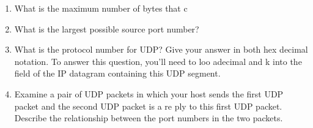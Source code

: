 \begin{enumerate}[label=\bfseries Problem \arabic*:,leftmargin=*,labelindent=1em]
        \item What is the maximum number of bytes that c\\[0.2mm]
        \soln
        \item What is the largest possible source port number?\\[0.2mm]
        \soln
        \item What is the protocol number for UDP? 
        Give your answer in both hex decimal notation. 
        To answer this question, you’ll need to loo adecimal and k into the field of the IP datagram containing this UDP segment.\\[0.2mm]
        \soln
        \item Examine a pair of UDP packets in which your host sends the first UDP packet and the second UDP packet is a re ply to this first UDP packet.  Describe the relationship between the port numbers in the two packets.\\[0.2mm]
        \soln
    \end{enumerate}
\newpage